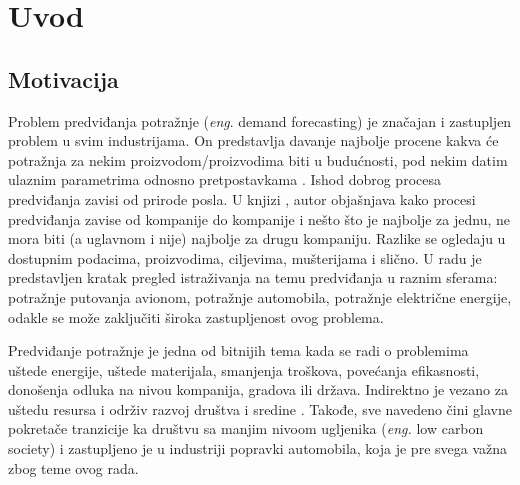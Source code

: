 \documentclass[12pt,oneside]{memoir}
\begin{document}
\frontmatter
\naslovna
\komisija
\apstrakt
\tableofcontents*

\mainmatter

\chapter{Uvod}
\section{Motivacija}
Problem predviđanja potražnje (\textit{eng}. demand forecasting) je značajan i zastupljen problem u svim industrijama. On predstavlja davanje najbolje procene kakva će potražnja za nekim proizvodom/proizvodima biti u budućnosti, pod nekim datim ulaznim parametrima odnosno pretpostavkama \cite{moon2018demand}. Ishod dobrog procesa predviđanja zavisi od prirode posla. U knjizi \cite{moon2018demand}, autor objašnjava kako procesi predviđanja zavise od kompanije do kompanije i nešto što je najbolje za jednu, ne mora biti (a uglavnom i nije) najbolje za drugu kompaniju. Razlike se ogledaju u dostupnim podacima, proizvodima, ciljevima, mušterijama i slično. U radu \cite{zulkepli2015demand} je predstavljen kratak pregled istraživanja na temu predviđanja u raznim sferama: potražnje putovanja avionom, potražnje automobila, potražnje električne energije, odakle se može zaključiti široka zastupljenost ovog problema.

Predviđanje potražnje je jedna od bitnijih tema kada se radi o problemima uštede energije, uštede materijala, smanjenja troškova, povećanja efikasnosti, donošenja odluka na nivou kompanija, gradova ili država. Indirektno je vezano za uštedu resursa i održiv razvoj društva i sredine \cite{tratar2019forecasting}. Takođe, sve navedeno čini glavne pokretače tranzicije ka društvu sa manjim nivoom ugljenika (\textit{eng.} low carbon society) \cite{eu2050} i zastupljeno je u industriji popravki automobila, koja je pre svega važna zbog teme ovog rada.
\end{document}
